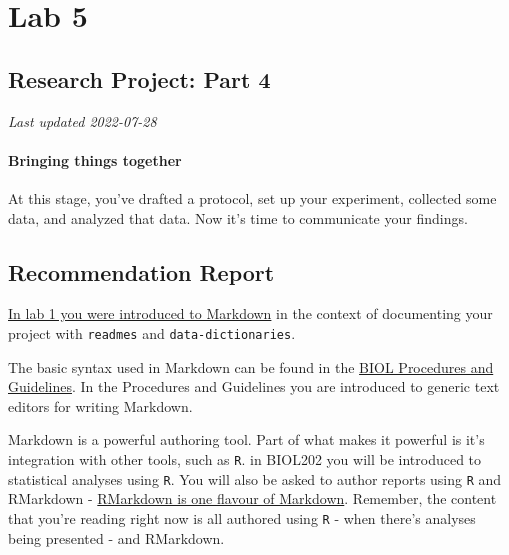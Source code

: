 \documentclass[
]{book}
\begin{document}
\hypertarget{part-lab-5}{%
\part*{Lab 5}\label{part-lab-5}}

\hypertarget{research-project-part-4}{%
\chapter*{Research Project: Part 4}\label{research-project-part-4}}

\emph{Last updated 2022-07-28}

\hypertarget{bringing-things-together}{%
\subsection*{Bringing things together}\label{bringing-things-together}}

At this stage, you've drafted a protocol, set up your experiment, collected some data, and analyzed that data. Now it's time to communicate your findings.

\hypertarget{recommendation-report}{%
\chapter*{Recommendation Report}\label{recommendation-report}}

\href{https://ubco-biology.github.io/Procedures-and-Guidelines/readme-files-and-data-dictionaries.html\#markdown}{In lab 1 you were introduced to Markdown} in the context of documenting your project with \texttt{readmes} and \texttt{data-dictionaries}.

The basic syntax used in Markdown can be found in the \href{https://ubco-biology.github.io/Procedures-and-Guidelines/markdown-1.html}{BIOL Procedures and Guidelines}. In the Procedures and Guidelines you are introduced to generic text editors for writing Markdown.

Markdown is a powerful authoring tool. Part of what makes it powerful is it's integration with other tools, such as \texttt{R}. in BIOL202 you will be introduced to statistical analyses using \texttt{R}. You will also be asked to author reports using \texttt{R} and RMarkdown - \href{https://ubco-biology.github.io/Procedures-and-Guidelines/markdown-flavours.html}{RMarkdown is one flavour of Markdown}. Remember, the content that you're reading right now is all authored using \texttt{R} - when there's analyses being presented - and RMarkdown.
\end{document}
